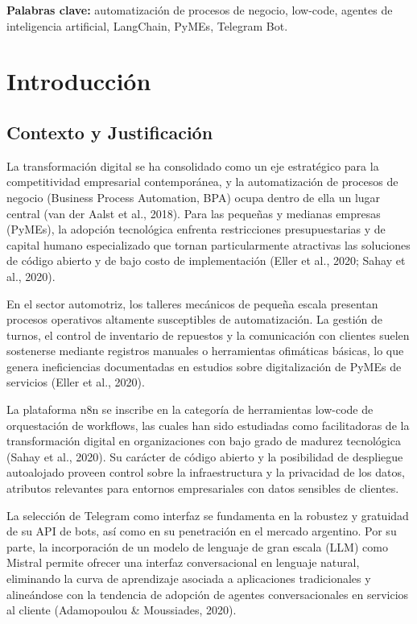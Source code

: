 \documentclass[12pt,a4paper]{report}
\begin{document}
\noindent\textbf{Palabras clave:} automatización de procesos de negocio, low-code, agentes de inteligencia artificial, LangChain, PyMEs, Telegram Bot.

\chapter{Introducción}

\section{Contexto y Justificación}

La transformación digital se ha consolidado como un eje estratégico para la competitividad empresarial contemporánea, y la automatización de procesos de negocio (Business Process Automation, BPA) ocupa dentro de ella un lugar central (van der Aalst et al., 2018). Para las pequeñas y medianas empresas (PyMEs), la adopción tecnológica enfrenta restricciones presupuestarias y de capital humano especializado que tornan particularmente atractivas las soluciones de código abierto y de bajo costo de implementación (Eller et al., 2020; Sahay et al., 2020).

En el sector automotriz, los talleres mecánicos de pequeña escala presentan procesos operativos altamente susceptibles de automatización. La gestión de turnos, el control de inventario de repuestos y la comunicación con clientes suelen sostenerse mediante registros manuales o herramientas ofimáticas básicas, lo que genera ineficiencias documentadas en estudios sobre digitalización de PyMEs de servicios (Eller et al., 2020).

La plataforma n8n se inscribe en la categoría de herramientas low-code de orquestación de workflows, las cuales han sido estudiadas como facilitadoras de la transformación digital en organizaciones con bajo grado de madurez tecnológica (Sahay et al., 2020). Su carácter de código abierto y la posibilidad de despliegue autoalojado proveen control sobre la infraestructura y la privacidad de los datos, atributos relevantes para entornos empresariales con datos sensibles de clientes.

La selección de Telegram como interfaz se fundamenta en la robustez y gratuidad de su API de bots, así como en su penetración en el mercado argentino. Por su parte, la incorporación de un modelo de lenguaje de gran escala (LLM) como Mistral permite ofrecer una interfaz conversacional en lenguaje natural, eliminando la curva de aprendizaje asociada a aplicaciones tradicionales y alineándose con la tendencia de adopción de agentes conversacionales en servicios al cliente (Adamopoulou \& Moussiades, 2020).
\end{document}
